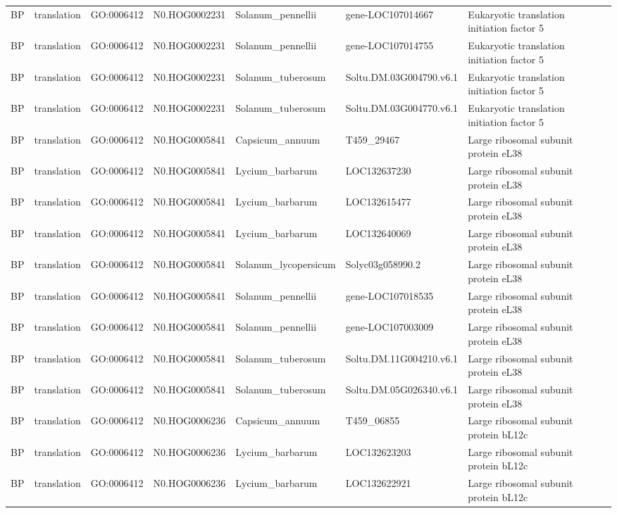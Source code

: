 \begin{table}
\begin{tabular}[t]{lllllll}
BP & translation & GO:0006412 & N0.HOG0002231 & Solanum\_pennellii & gene-LOC107014667 & Eukaryotic translation initiation factor 5\\
BP & translation & GO:0006412 & N0.HOG0002231 & Solanum\_pennellii & gene-LOC107014755 & Eukaryotic translation initiation factor 5\\
BP & translation & GO:0006412 & N0.HOG0002231 & Solanum\_tuberosum & Soltu.DM.03G004790.v6.1 & Eukaryotic translation initiation factor 5\\
BP & translation & GO:0006412 & N0.HOG0002231 & Solanum\_tuberosum & Soltu.DM.03G004770.v6.1 & Eukaryotic translation initiation factor 5\\
BP & translation & GO:0006412 & N0.HOG0005841 & Capsicum\_annuum & T459\_29467 & Large ribosomal subunit protein eL38\\
BP & translation & GO:0006412 & N0.HOG0005841 & Lycium\_barbarum & LOC132637230 & Large ribosomal subunit protein eL38\\
BP & translation & GO:0006412 & N0.HOG0005841 & Lycium\_barbarum & LOC132615477 & Large ribosomal subunit protein eL38\\
BP & translation & GO:0006412 & N0.HOG0005841 & Lycium\_barbarum & LOC132640069 & Large ribosomal subunit protein eL38\\
BP & translation & GO:0006412 & N0.HOG0005841 & Solanum\_lycopersicum & Solyc03g058990.2 & Large ribosomal subunit protein eL38\\
BP & translation & GO:0006412 & N0.HOG0005841 & Solanum\_pennellii & gene-LOC107018535 & Large ribosomal subunit protein eL38\\
BP & translation & GO:0006412 & N0.HOG0005841 & Solanum\_pennellii & gene-LOC107003009 & Large ribosomal subunit protein eL38\\
BP & translation & GO:0006412 & N0.HOG0005841 & Solanum\_tuberosum & Soltu.DM.11G004210.v6.1 & Large ribosomal subunit protein eL38\\
BP & translation & GO:0006412 & N0.HOG0005841 & Solanum\_tuberosum & Soltu.DM.05G026340.v6.1 & Large ribosomal subunit protein eL38\\
BP & translation & GO:0006412 & N0.HOG0006236 & Capsicum\_annuum & T459\_06855 & Large ribosomal subunit protein bL12c\\
BP & translation & GO:0006412 & N0.HOG0006236 & Lycium\_barbarum & LOC132623203 & Large ribosomal subunit protein bL12c\\
BP & translation & GO:0006412 & N0.HOG0006236 & Lycium\_barbarum & LOC132622921 & Large ribosomal subunit protein bL12c\\

\end{tabular}
\end{table}
